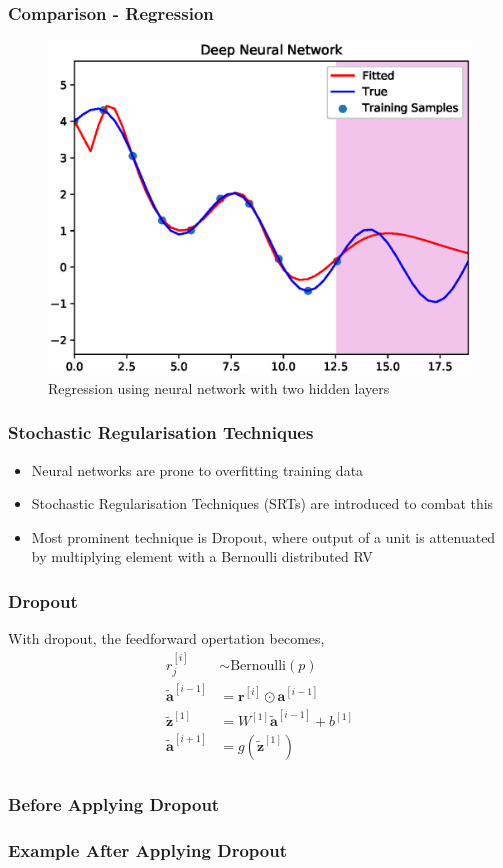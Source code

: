 \documentclass{beamer}
\newcommand{\mb}[1]{\mathbf{#1}}
\begin{document}
\begin{frame}
  \frametitle{Comparison - Regression}
  \vspace*{-0.15cm}
  \begin{figure}[!h]
    \centering
    \includegraphics[width=0.8\linewidth]{./figs/nn.eps}
    \caption{Regression using neural network with two hidden layers}
    \label{fig:nn}
  \end{figure}
\end{frame}
% 
% 
% 
% 
\begin{frame}
  \frametitle{Stochastic Regularisation Techniques}
  \begin{itemize}
  \item Neural networks are prone to overfitting training data
  \item Stochastic Regularisation Techniques (SRTs) are introduced to combat this
  \item Most prominent technique is Dropout, where output of a unit is attenuated by multiplying element with a Bernoulli distributed RV \cite{sriv2014}
  \end{itemize}
\end{frame}
% 
% 
%
\begin{frame}
  \frametitle{Dropout}
  With dropout, the feedforward opertation becomes,
  \begin{align*}
    r_j^{[i]} & \sim \text{Bernoulli}(p)\\
    \widetilde{\mb{a}}^{[i-1]} &= \mb{r}^{[i]} \odot \mb{a}^{[i-1]} \\
    \widetilde{\mb{z}}^{[1]} &= W^{[1]}\widetilde{\mb{a}}^{[i-1]} + b^{[1]}\\
    \widetilde{\mb{a}}^{[i+1]} &= g(\widetilde{\mb{z}}^{[1]})\\
  \end{align*}    
\end{frame}
% 
% 
\begin{frame}
  \frametitle{Before Applying Dropout}
  
\end{frame}
% 
% 
% 
% 
\begin{frame}
  \frametitle{Example After Applying Dropout}
  
\end{frame}
% 
% 
% 
% 
\end{document}
